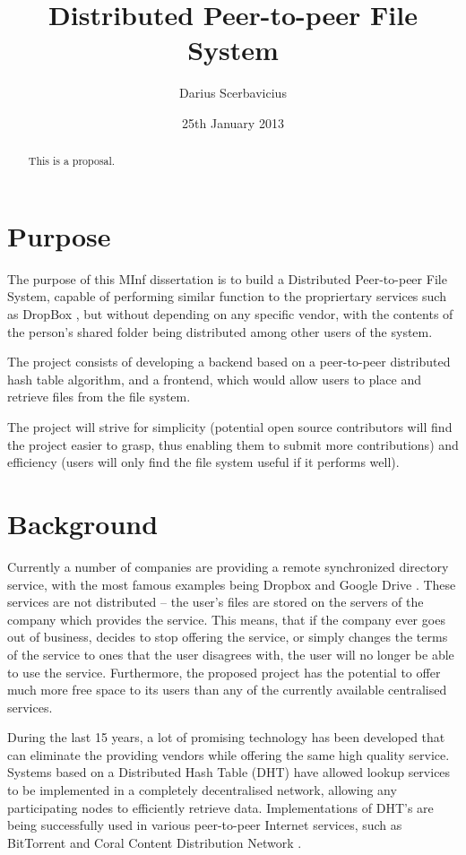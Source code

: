 \documentclass[8pt,a4paper]{article}
\title{Distributed Peer-to-peer File System}
\author{Darius Scerbavicius}
\date{25th January 2013}
\begin{document}
\maketitle

\begin{abstract}
This is a proposal.
\end{abstract}

\section{Purpose}
The purpose of this MInf dissertation is to build a Distributed Peer-to-peer File System, capable of performing similar function to the propriertary services such as DropBox \cite{dropbox}, but without depending on any specific vendor, with the contents of the person's shared folder being distributed among other users of the system. 

The project consists of developing a backend based on a peer-to-peer distributed hash table algorithm, and a frontend, which would allow users to place and retrieve files from the file system.

The project will strive for simplicity (potential open source contributors will find the project easier to grasp, thus enabling them to submit more contributions) and efficiency (users will only find the file system useful if it performs well). 

\section{Background}

Currently a number of companies are providing a remote synchronized directory service, with the most famous examples being Dropbox \cite{dropbox} and Google Drive \cite{gdrive}. These services are not distributed -- the user's files are stored on the servers of the company which provides the service. This means, that if the company ever goes out of business, decides to stop offering the service, or simply changes the terms of the service to ones that the user disagrees with, the user will no longer be able to use the service. 
Furthermore, the proposed project has the potential to offer much more free space to its users than any of the currently available centralised services.

During the last 15 years, a lot of promising technology has been developed that can eliminate the providing vendors while offering the same high quality service. 
Systems based on a Distributed Hash Table (DHT) have allowed lookup services to be implemented in a completely decentralised network, allowing any participating nodes to efficiently retrieve data. Implementations of DHT's are being successfully used in various peer-to-peer Internet services, such as BitTorrent and Coral Content Distribution Network \cite{coral}.
\end{document}
